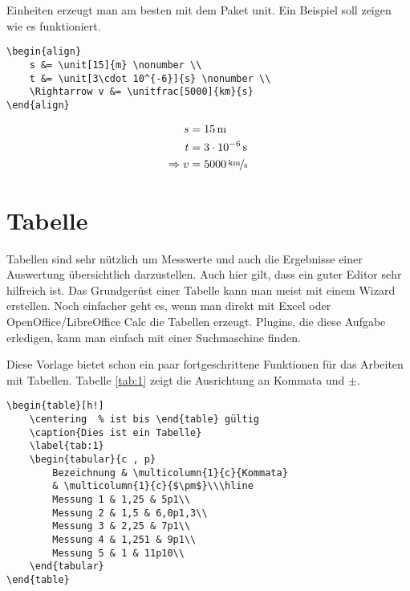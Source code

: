 Einheiten erzeugt man am besten mit dem Paket unit. Ein Beispiel soll zeigen wie es funktioniert.

\begin{verbatim}
\begin{align}
    s &= \unit[15]{m} \nonumber \\
    t &= \unit[3\cdot 10^{-6}]{s} \nonumber \\
    \Rightarrow v &= \unitfrac[5000]{km}{s}
\end{align}
\end{verbatim}

\begin{align}
    s &= \unit[15]{m} \nonumber \\
    t &= \unit[3\cdot 10^{-6}]{s} \nonumber \\
    \Rightarrow v &= \unitfrac[5000]{km}{s}
\end{align}

\section{Tabelle}

Tabellen sind sehr nützlich um Messwerte und auch die Ergebnisse einer Auswertung übersichtlich darzustellen. Auch hier gilt, dass ein guter Editor sehr hilfreich ist. Das Grundgerüst einer Tabelle kann man meist mit einem Wizard erstellen. Noch einfacher geht es, wenn man direkt mit Excel oder OpenOffice/LibreOffice Calc die Tabellen erzeugt. Plugins, die diese Aufgabe erledigen, kann man einfach mit einer Suchmaschine finden.

Diese Vorlage bietet schon ein paar fortgeschrittene Funktionen für das Arbeiten mit Tabellen. Tabelle \ref{tab:1} zeigt die Ausrichtung an Kommata und $\pm$.

\begin{verbatim}
\begin{table}[h!]
    \centering	% ist bis \end{table} gültig
    \caption{Dies ist ein Tabelle}
    \label{tab:1}
    \begin{tabular}{c , p}
        Bezeichnung & \multicolumn{1}{c}{Kommata}
        & \multicolumn{1}{c}{$\pm$}\\\hline
        Messung 1 & 1,25 & 5p1\\
        Messung 2 & 1,5 & 6,0p1,3\\
        Messung 3 & 2,25 & 7p1\\
        Messung 4 & 1,251 & 9p1\\
        Messung 5 & 1 & 11p10\\
    \end{tabular}
\end{table}
\end{verbatim}

